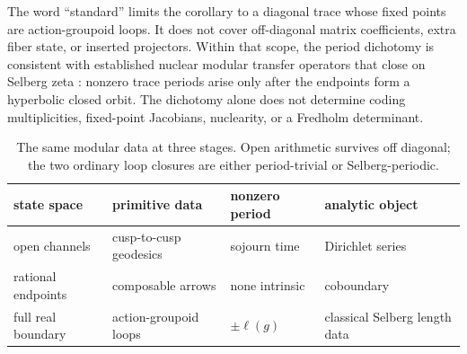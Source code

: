 The word ``standard'' limits the corollary to a diagonal trace whose fixed
points are action-groupoid loops.  It does not cover off-diagonal matrix
coefficients, extra fiber state, or inserted projectors.  Within that scope,
the period dichotomy is consistent with established nuclear modular transfer
operators that close on Selberg zeta \cite{Mayer1991,PohlWabnitz2026}:
nonzero trace periods arise only after the endpoints form a hyperbolic closed
orbit.  The dichotomy alone does not determine coding multiplicities,
fixed-point Jacobians, nuclearity, or a Fredholm determinant.

\begin{table}[t]
\centering
\caption{The same modular data at three stages.  Open arithmetic survives off
diagonal; the two ordinary loop closures are either period-trivial or
Selberg-periodic.}
\begin{tabular}{llll}
\toprule
state space & primitive data & nonzero period & analytic object \\
\midrule
open channels & cusp-to-cusp geodesics & sojourn time & Dirichlet series \\
rational endpoints & composable arrows & none intrinsic & coboundary \\
full real boundary & action-groupoid loops & \(\pm\ell(g)\) & classical Selberg length data \\
\bottomrule
\end{tabular}
\label{tab:closure-types}
\end{table}
